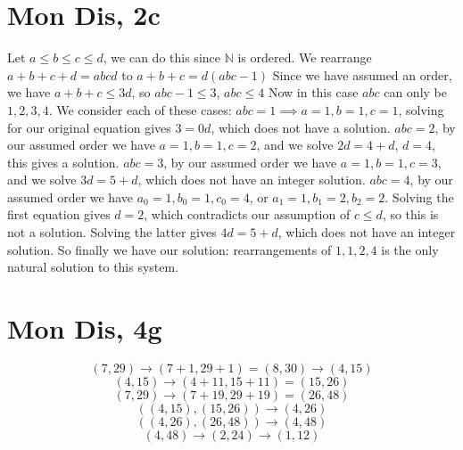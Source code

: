 \documentclass[12pt]{article}
\author{Tianshuang (Ethan) Qiu}
\newcommand{\N}{\mathbb{N}}
\begin{document}
\section{Mon Dis, 2c}
Let $a\leq b \leq c \leq d$, we can do this since $\N$ is ordered. We rearrange $a+b+c+d = abcd$ to $a+b+c = d(abc-1)$
\newline
Since we have assumed an order, we have $a+b+c \leq 3d$, so $abc-1 \leq 3$, $abc \leq 4$
\newline
Now in this case $abc$ can only be $1,2,3,4$. We consider each of these cases:
\newline
$abc = 1 \implies a=1, b=1, c=1$, solving for our original equation gives $3 = 0d$, which does not have a solution.
\newline
$abc = 2$, by our assumed order we have $a=1, b=1, c=2$, and we solve $2d=4+d$, $d=4$, this gives a solution.
\newline
$abc = 3$, by our assumed order we have $a=1, b=1, c=3$, and we solve $3d=5+d$, which does not have an integer solution.
\newline
$abc = 4$, by our assumed order we have $a_0=1, b_0=1, c_0=4$, or $a_1=1, b_1 = 2, b_2=2$. Solving the first equation gives $d = 2$, which contradicts our assumption of $c \leq d$, so this is not a solution. Solving the latter gives $4d = 5+d$, which does not have an integer solution.
\newline
So finally we have our solution: rearrangements of $1,1,2,4$ is the only natural solution to this system.

\section{Mon Dis, 4g}
$$(7,29) \to (7+1,29+1) = (8, 30) \to (4, 15)$$
$$(4,15) \to (4+11, 15+11) = (15, 26)$$
$$(7,29) \to (7+19, 29+19) = (26, 48)$$
$$((4, 15), (15,26)) \to (4, 26)$$
$$((4,26), (26,48)) \to (4,48)$$
$$(4, 48) \to (2, 24) \to (1, 12)$$
\end{document}
